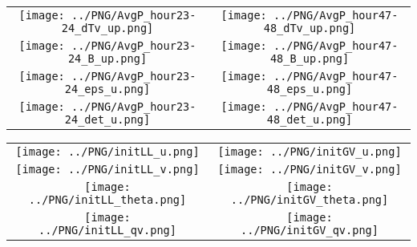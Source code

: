 \documentclass{article}
\begin{document}
\newpage

\begin{table}
  \begin{tabular}{cc}
     \texttt{[image: ../PNG/AvgP\_hour23-24\_dTv\_up.png]} & \texttt{[image: ../PNG/AvgP\_hour47-48\_dTv\_up.png]} \\
     \texttt{[image: ../PNG/AvgP\_hour23-24\_B\_up.png]}   & \texttt{[image: ../PNG/AvgP\_hour47-48\_B\_up.png]}   \\
     \texttt{[image: ../PNG/AvgP\_hour23-24\_eps\_u.png]}  & \texttt{[image: ../PNG/AvgP\_hour47-48\_eps\_u.png]}  \\
     \texttt{[image: ../PNG/AvgP\_hour23-24\_det\_u.png]}  & \texttt{[image: ../PNG/AvgP\_hour47-48\_det\_u.png]}
  \end{tabular}
\end{table}

\newpage

\begin{table}
  \begin{tabular}{cc}
     \texttt{[image: ../PNG/initLL\_u.png]}     & \texttt{[image: ../PNG/initGV\_u.png]}     \\
     \texttt{[image: ../PNG/initLL\_v.png]}     & \texttt{[image: ../PNG/initGV\_v.png]}     \\
     \texttt{[image: ../PNG/initLL\_theta.png]} & \texttt{[image: ../PNG/initGV\_theta.png]} \\
     \texttt{[image: ../PNG/initLL\_qv.png]}    & \texttt{[image: ../PNG/initGV\_qv.png]}
  \end{tabular}
\end{table}
\end{document}
